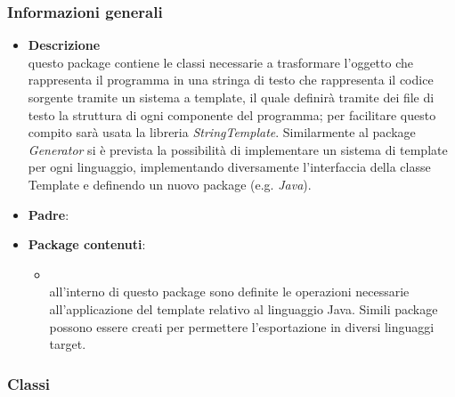\subsubsection{Informazioni generali}
\begin{itemize}
\item \textbf{Descrizione}\\
questo package contiene le classi necessarie a trasformare l'oggetto che rappresenta il programma in una stringa di testo che rappresenta il codice sorgente tramite un sistema a template, il quale definirà tramite dei file di testo la struttura di ogni componente del programma; per facilitare questo compito sarà usata la libreria \emph{StringTemplate}. Similarmente al package \emph{Generator} si è prevista la possibilità di implementare un sistema di template per ogni linguaggio, implementando diversamente l'interfaccia della classe Template e definendo un nuovo package (e.g. \emph{Java}).
\item \textbf{Padre}: \hyperref[\nogloxy{SWEDesigner::Server}]{}
\item \textbf{Package contenuti}:
\begin{itemize}
\item \hyperref[\nogloxy{SWEDesigner::Server::Template::Java}]{}\\
all'interno di questo package sono definite le operazioni necessarie all'applicazione del template relativo al linguaggio Java. Simili package possono essere creati per permettere l'esportazione in diversi linguaggi target.
\end{itemize}
\end{itemize}
\subsubsection{Classi}
